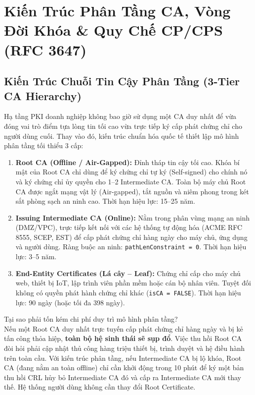 \chapter{Kiến Trúc Phân Tầng CA, Vòng Đời Khóa \& Quy Chế CP/CPS (RFC 3647)}


\section{Kiến Trúc Chuỗi Tin Cậy Phân Tầng (3-Tier CA Hierarchy)}

Hạ tầng PKI doanh nghiệp không bao giờ sử dụng một CA duy nhất để vừa đóng vai trò điểm tựa lòng tin tối cao vừa trực tiếp ký cấp phát chứng chỉ cho người dùng cuối. Thay vào đó, kiến trúc chuẩn hóa quốc tế thiết lập mô hình phân tầng tối thiểu 3 cấp:
\begin{enumerate}
  \item \textbf{Root CA (Offline / Air-Gapped):} Đỉnh tháp tin cậy tối cao. Khóa bí mật của Root CA chỉ dùng để ký chứng chỉ tự ký (Self-signed) cho chính nó và ký chứng chỉ ủy quyền cho 1--2 Intermediate CA. Toàn bộ máy chủ Root CA được ngắt mạng vật lý (Air-gapped), tắt nguồn và niêm phong trong két sắt phòng sạch an ninh cao. Thời hạn hiệu lực: 15--25 năm.
  \item \textbf{Issuing Intermediate CA (Online):} Nằm trong phân vùng mạng an ninh (DMZ/VPC), trực tiếp kết nối với các hệ thống tự động hóa (ACME RFC 8555, SCEP, EST) để cấp phát chứng chỉ hàng ngày cho máy chủ, ứng dụng và người dùng. Ràng buộc an ninh: \texttt{pathLenConstraint = 0}. Thời hạn hiệu lực: 3--5 năm.
  \item \textbf{End-Entity Certificates (Lá cây -- Leaf):} Chứng chỉ cấp cho máy chủ web, thiết bị IoT, lập trình viên phần mềm hoặc cán bộ nhân viên. Tuyệt đối không có quyền phát hành chứng chỉ khác (\texttt{isCA = FALSE}). Thời hạn hiệu lực: 90 ngày (hoặc tối đa 398 ngày).
\end{enumerate}

\begin{batngo}
Tại sao phải tốn kém chi phí duy trì mô hình phân tầng?\\
Nếu một Root CA duy nhất trực tuyến cấp phát chứng chỉ hàng ngày và bị kẻ tấn công thỏa hiệp, \textbf{toàn bộ hệ sinh thái sẽ sụp đổ}. Việc thu hồi Root CA đòi hỏi phải cập nhật thủ công hàng triệu thiết bị, trình duyệt và hệ điều hành trên toàn cầu. Với kiến trúc phân tầng, nếu Intermediate CA bị lộ khóa, Root CA (đang nằm an toàn offline) chỉ cần khởi động trong 10 phút để ký một bản thu hồi CRL hủy bỏ Intermediate CA đó và cấp ra Intermediate CA mới thay thế. Hệ thống người dùng không cần thay đổi Root Certificate.
\end{batngo}

